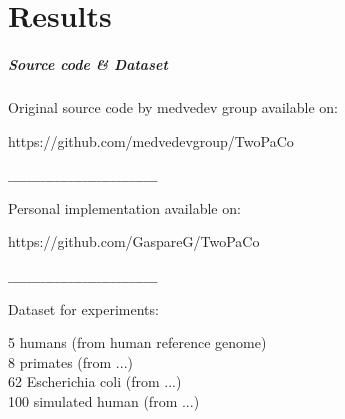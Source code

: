 \part{Results}

\begin{frame}
	\partpage
	\centering
\end{frame}


\begin{frame}
	\frametitle{Source code \& Dataset}
	\centering
	
	Original source code by medvedev group available on:\\
	
	\medskip
	
	https://github.com/medvedevgroup/TwoPaCo \\
	
	\medskip
	
	$\_\_\_\_\_\_\_\_\_\_\_\_\_\_\_\_\_\_\_\_\_\_\_\_\_\_\_\_\_\_\_\_$ \\
	
	\medskip

	Personal implementation available on:\\
	
	\medskip
	
	https://github.com/GaspareG/TwoPaCo
	
	\medskip
	
	$\_\_\_\_\_\_\_\_\_\_\_\_\_\_\_\_\_\_\_\_\_\_\_\_\_\_\_\_\_\_\_\_$ \\

	\medskip
		
	Dataset for experiments:

	\medskip
	
	5 humans (from human reference genome)\\
  8 primates (from ...)\\
	62 Escherichia coli (from ...)\\
  100 simulated human (from ...)\\
	
	
\end{frame}


